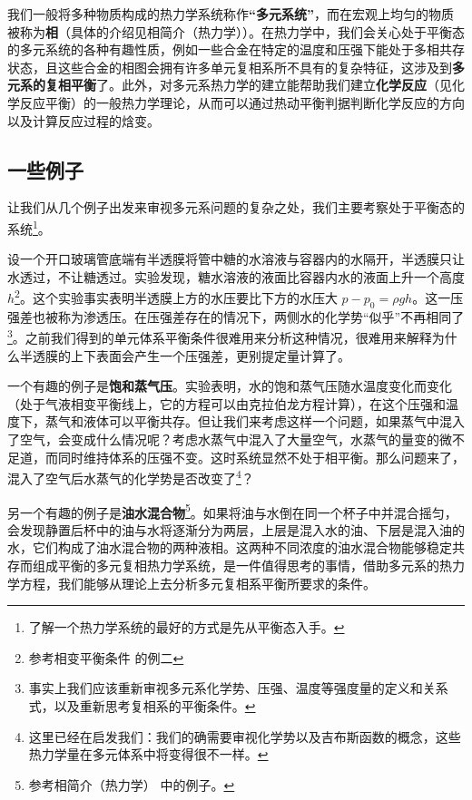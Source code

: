 
我们一般将多种物质构成的热力学系统称作\textbf{“多元系统”}，而在宏观上均匀的物质被称为\textbf{相}（具体的介绍见相简介（热力学））。在热力学中，我们会关心处于平衡态的多元系统的各种有趣性质，例如一些合金在特定的温度和压强下能处于多相共存状态，且这些合金的相图会拥有许多单元复相系所不具有的复杂特征，这涉及到\textbf{多元系的复相平衡}了。此外，对多元系热力学的建立能帮助我们建立\textbf{化学反应}（见化学反应平衡）的一般热力学理论，从而可以通过热动平衡判据判断化学反应的方向以及计算反应过程的焓变。
\subsection{一些例子}
让我们从几个例子出发来审视多元系问题的复杂之处，我们主要考察处于平衡态的系统\footnote{了解一个热力学系统的最好的方式是先从平衡态入手。}。

设一个开口玻璃管底端有半透膜将管中糖的水溶液与容器内的水隔开，半透膜只让水透过，不让糖透过。实验发现，糖水溶液的液面比容器内水的液面上升一个高度 $h$\footnote{参考相变平衡条件 的例二}。这个实验事实表明半透膜上方的水压要比下方的水压大 $p-p_0=\rho g h$。这一压强差也被称为渗透压。在压强差存在的情况下，两侧水的化学势“似乎”不再相同了\footnote{事实上我们应该重新审视多元系化学势、压强、温度等强度量的定义和关系式，以及重新思考复相系的平衡条件。}。之前我们得到的单元体系平衡条件很难用来分析这种情况，很难用来解释为什么半透膜的上下表面会产生一个压强差，更别提定量计算了。

一个有趣的例子是\textbf{饱和蒸气压}。实验表明，水的饱和蒸气压随水温度变化而变化（处于气液相变平衡线上，它的方程可以由克拉伯龙方程计算），在这个压强和温度下，蒸气和液体可以平衡共存。但让我们来考虑这样一个问题，如果蒸气中混入了空气，会变成什么情况呢？考虑水蒸气中混入了大量空气，水蒸气的量变的微不足道，而同时维持体系的压强不变。这时系统显然不处于相平衡。那么问题来了，混入了空气后水蒸气的化学势是否改变了\footnote{这里已经在启发我们：我们的确需要审视化学势以及吉布斯函数的概念，这些热力学量在多元体系中将变得很不一样。}？

另一个有趣的例子是\textbf{油水混合物}\footnote{参考相简介（热力学） 中的例子。}。如果将油与水倒在同一个杯子中并混合摇匀，会发现静置后杯中的油与水将逐渐分为两层，上层是混入水的油、下层是混入油的水，它们构成了油水混合物的两种液相。这两种不同浓度的油水混合物能够稳定共存而组成平衡的多元复相热力学系统，是一件值得思考的事情，借助多元系的热力学方程，我们能够从理论上去分析多元复相系平衡所要求的条件。

